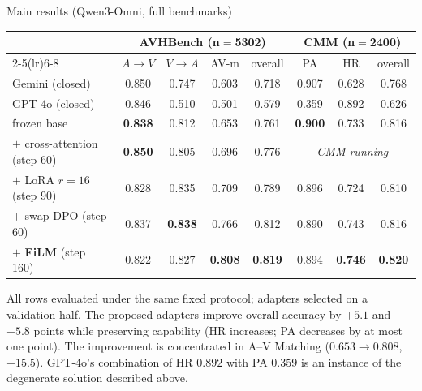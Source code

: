 \documentclass[aspectratio=169,11pt]{beamer}
\begin{document}

\begin{frame}{Main results (Qwen3-Omni, full benchmarks)}
\centering
\renewcommand{\arraystretch}{1.2}
\footnotesize
\begin{tabular}{l cccc ccc}
\toprule
& \multicolumn{4}{c}{AVHBench (n$=$5302)} & \multicolumn{3}{c}{CMM (n$=$2400)} \\
\cmidrule(lr){2-5}\cmidrule(lr){6-8}
 & $A\!\to\!V$ & $V\!\to\!A$ & AV-m & overall & PA & HR & overall \\
\midrule
Gemini {\tiny(closed)} & 0.850 & 0.747 & 0.603 & 0.718 & 0.907 & 0.628 & 0.768 \\
GPT-4o {\tiny(closed)} & 0.846 & 0.510 & 0.501 & 0.579 & 0.359 & 0.892 & 0.626 \\
\midrule
frozen base            & \textbf{0.838} & 0.812 & 0.653 & 0.761 & \textbf{0.900} & 0.733 & 0.816 \\
$+$ cross-attention (step 60) & \textbf{0.850} & 0.805 & 0.696 & 0.776 & \multicolumn{3}{c}{\emph{CMM running}} \\
$+$ LoRA $r{=}16$ (step 90) & 0.828 & 0.835 & 0.709 & 0.789 & 0.896 & 0.724 & 0.810 \\
$+$ swap-DPO (step 60) & 0.837 & \textbf{0.838} & 0.766 & 0.812 & 0.890 & 0.743 & 0.816 \\
$+$ \textbf{FiLM} (step 160) & 0.822 & 0.827 & \textbf{0.808} & \textbf{0.819} & 0.894 & \textbf{0.746} & \textbf{0.820} \\
\bottomrule
\end{tabular}
\vfill
{\footnotesize All rows evaluated under the same fixed protocol; adapters selected on a validation
half. The proposed adapters improve overall accuracy by $+5.1$ and $+5.8$ points while preserving
capability (HR increases; PA decreases by at most one point). The improvement is concentrated in
A--V Matching ($0.653 \to 0.808$, $+15.5$). GPT-4o's combination of HR $0.892$ with PA $0.359$ is an
instance of the degenerate solution described above.}
\end{frame}
\end{document}
